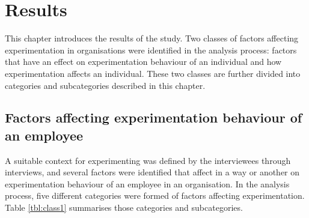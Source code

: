 \chapter{Results} \label{results}
This chapter introduces the results of the study. Two classes of factors affecting experimentation in organisations were identified in the analysis process: factors that have an effect on experimentation behaviour of an individual and how experimentation affects an individual. These two classes are further divided into categories and subcategories described in this chapter. 

\section{Factors affecting experimentation behaviour of an employee}
A suitable context for experimenting was defined by the interviewees through interviews, and several factors were identified that affect in a way or another on experimentation behaviour of an employee in an organisation. In the analysis process, five different categories were formed of factors affecting experimentation. Table \ref{tbl:class1} summarises those categories and subcategories. 

